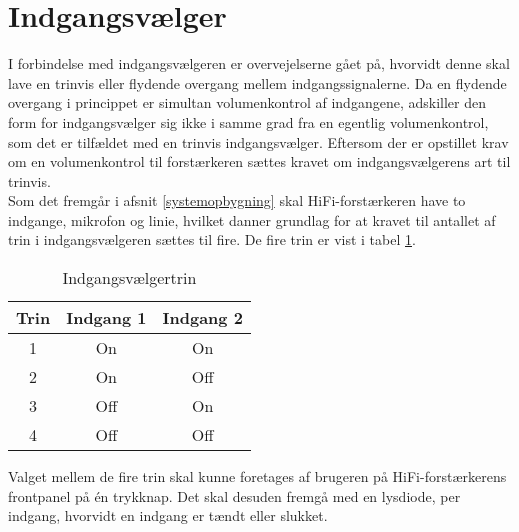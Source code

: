 \section{Indgangsvælger}
\label{valg_indgangsvaelger}
I forbindelse med indgangsvælgeren er overvejelserne gået på, hvorvidt denne skal lave en trinvis eller flydende overgang mellem indgangssignalerne. Da en flydende overgang i princippet er simultan volumenkontrol af indgangene, adskiller den form for indgangsvælger sig ikke i samme grad fra en egentlig volumenkontrol, som det er tilfældet med en trinvis indgangsvælger. Eftersom der er opstillet krav om en volumenkontrol til forstærkeren sættes kravet om indgangsvælgerens art til trinvis. \\
Som det fremgår i afsnit \ref{systemopbygning} skal HiFi-forstærkeren have to indgange, mikrofon og linie, hvilket danner grundlag for at kravet til antallet af trin i indgangsvælgeren sættes til fire. De fire trin er vist i tabel \ref{tab:indgangsvaelgertrin}.

\begin{table}[h]
\centering
\begin{tabular}{c|c|c}
\hline\hline
Trin & Indgang 1 & Indgang 2 \\
\hline\hline
1 & On & On \\
2 & On & Off \\
3 & Off & On \\
4 & Off & Off \\
\hline\hline
\end{tabular}
\caption{Indgangsvælgertrin}
\label{tab:indgangsvaelgertrin}
\end{table}

Valget mellem de fire trin skal kunne foretages af brugeren på HiFi-forstærkerens frontpanel på én trykknap. Det skal desuden fremgå med en lysdiode, per indgang, hvorvidt en indgang er tændt eller slukket.
